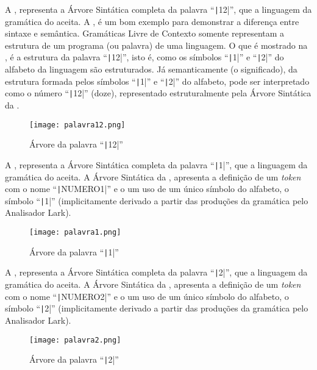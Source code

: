 A ,
representa a Árvore Sintática completa da palavra ``\texttt|12|'',
que a linguagem da gramática do  aceita.
A ,
é um bom exemplo para demonstrar a diferença entre sintaxe e
semântica.
Gramáticas Livre de Contexto somente representam a estrutura de um programa (ou palavra) de uma linguagem.
O que é mostrado na ,
é a estrutura da palavra ``\texttt|12|'',
isto é,
como os símbolos ``\texttt|1|'' e
``\texttt|2|'' do alfabeto da linguagem são estruturados.
Já semanticamente (o significado),
da estrutura formada pelos símbolos ``\texttt|1|'' e
``\texttt|2|'' do alfabeto,
pode ser interpretado como o número ``\texttt|12|'' (doze),
representado estruturalmente pela Árvore Sintática da .
\begin{figure}[H]
\caption[Árvore da palavra ``12'']{Árvore da palavra ``\texttt|12|''}
\label{figure:palavra12}
\centering
\texttt{[image: palavra12.png]}
\end{figure}

A ,
representa a Árvore Sintática completa da palavra ``\texttt|1|'',
que a linguagem da gramática do  aceita.
A Árvore Sintática da ,
apresenta a definição de um \textit{token} com o nome ``\texttt|NUMERO1|'' e
o um uso de um único símbolo do alfabeto,
o símbolo ``\texttt|1|'' (implicitamente derivado a partir das produções da gramática pelo Analisador Lark).
\begin{figure}[H]
\caption[Árvore da palavra ``1'']{Árvore da palavra ``\texttt|1|''}
\label{figure:palavra1}
\centering
\texttt{[image: palavra1.png]}
\end{figure}

A ,
representa a Árvore Sintática completa da palavra ``\texttt|2|'',
que a linguagem da gramática do  aceita.
A Árvore Sintática da ,
apresenta a definição de um \textit{token} com o nome ``\texttt|NUMERO2|'' e
o um uso de um único símbolo do alfabeto,
o símbolo ``\texttt|2|'' (implicitamente derivado a partir das produções da gramática pelo Analisador Lark).
\begin{figure}[H]
\caption[Árvore da palavra ``2'']{Árvore da palavra ``\texttt|2|''}
\label{figure:palavra2}
\centering
\texttt{[image: palavra2.png]}
\end{figure}

